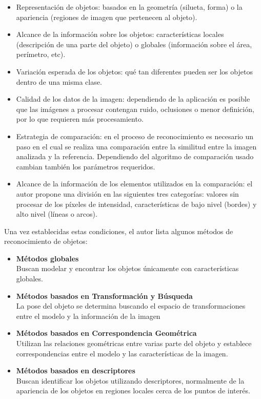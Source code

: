\begin{itemize}
    \item Representación de objetos: basados en la geometría (silueta, forma) o la apariencia (regiones de imagen que pertenecen al objeto).
    \item Alcance de la información sobre los objetos: características locales (descripción de una parte del objeto) o globales (información sobre el área, perímetro, etc).
    \item Variación esperada de los objetos: qué tan diferentes pueden ser los objetos dentro de una misma clase.
    \item Calidad de los datos de la imagen: dependiendo de la aplicación es posible que las imágenes a procesar contengan ruido, oclusiones o menor definición, por lo que requieren más procesamiento.
    \item Estrategia de comparación: en el proceso de reconocimiento es necesario un paso en el cual se realiza una comparación entre la similitud entre la imagen analizada y la referencia. Dependiendo del algoritmo de comparación usado cambian también los parámetros requeridos.
    \item Alcance de la información de los elementos utilizados en la comparación: el autor propone una división en las siguientes tres categorías: valores sin procesar de los píxeles de intensidad, características de bajo nivel (bordes) y alto nivel (líneas o arcos). 
\end{itemize}

Una vez establecidas estas condiciones, el autor lista algunos métodos de reconocimiento de objetos:

\begin{itemize}
    \item \textbf{Métodos globales}\\ Buscan modelar y encontrar los objetos únicamente con características globales.
    \item \textbf{Métodos basados en Transformación y Búsqueda}\\ La pose del objeto se determina buscando el espacio de transformaciones entre el modelo y la información de la imagen
    \item \textbf{Métodos basados en Correspondencia Geométrica}\\ Utilizan las relaciones geométricas entre varias parte del objeto y establece correspondencias entre el modelo y las características de la imagen.
    \item \textbf{Métodos basados en descriptores}\\ Buscan identificar los objetos utilizando descriptores, normalmente de la apariencia de los objetos en regiones locales cerca de los puntos de interés. 
\end{itemize}

